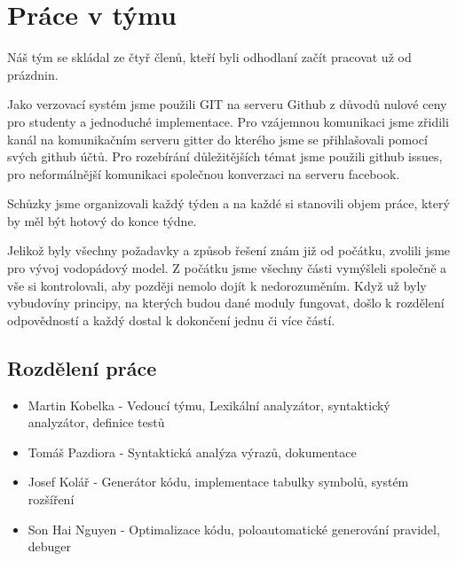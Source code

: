\section{Práce v týmu}
Náš tým se skládal ze čtyř členů, kteří byli odhodlaní začít
pracovat už od prázdnin.

Jako verzovací systém jsme použili GIT
na serveru Github z důvodů nulové ceny pro studenty a jednoduché
implementace. Pro vzájemnou komunikaci jsme zřidili kanál na komunikačním serveru
gitter do kterého jsme se přihlašovali pomocí svých github účtů. Pro rozebírání
důležitějších témat jsme použili github issues, pro neformálnější komunikaci
společnou konverzaci na serveru facebook.

Schůzky jsme organizovali každý týden a na každé si stanovili objem práce, který by měl
být hotový do konce týdne.


Jelikož byly všechny požadavky a způsob řešení znám již od počátku, zvolili jsme pro vývoj
vodopádový model.
Z počátku jsme všechny části vymýšleli společně a vše si kontrolovali,
aby později nemolo dojít k nedorozuměním. Když už byly vybudovíny principy,
na kterých budou dané moduly fungovat, došlo k rozdělení
odpovědností a každý dostal k dokončení jednu či více částí.

\subsection{Rozdělení práce}
\begin{itemize}
    \item Martin Kobelka - Vedoucí týmu, Lexikální analyzátor, syntaktický analyzátor, definice testů
    \item Tomáš Pazdiora - Syntaktická analýza výrazů, dokumentace
    \item Josef Kolář - Generátor kódu, implementace tabulky symbolů, systém rozšíření
    \item Son Hai Nguyen - Optimalizace kódu, poloautomatické generování pravidel, debuger
\end{itemize}